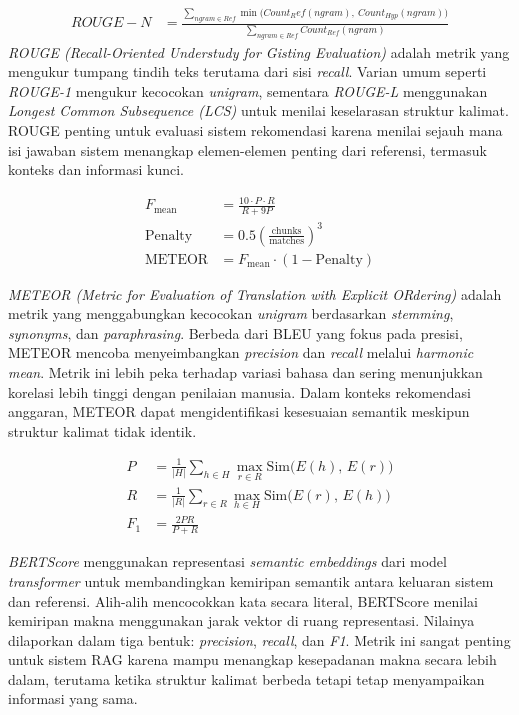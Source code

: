 \begin{align}
ROUGE-N &= \frac{\sum_{ngram \in Ref}\min\big(Count_Ref(ngram),\ Count_{Hyp}(ngram)\big)
}{
\sum_{ngram \in Ref} 
Count_{Ref}(ngram)
}
\end{align}
\textit{ROUGE (Recall-Oriented Understudy for Gisting Evaluation)} adalah metrik yang mengukur tumpang tindih teks terutama dari sisi \textit{recall}. Varian umum seperti \textit{ROUGE-1} mengukur kecocokan \textit{unigram}, sementara \textit{ROUGE-L} menggunakan \textit{Longest Common Subsequence (LCS)} untuk menilai keselarasan struktur kalimat. ROUGE penting untuk evaluasi sistem rekomendasi karena menilai sejauh mana isi jawaban sistem menangkap elemen-elemen penting dari referensi, termasuk konteks dan informasi kunci.

\begin{align}
F_{\text{mean}} &= 
\frac{10 \cdot P \cdot R}{R + 9P}
\\[6pt]
\text{Penalty} &= 
0.5\left( \frac{\text{chunks}}{\text{matches}} \right)^3
\\[6pt]
\text{METEOR} &= 
F_{\text{mean}} \cdot (1 - \text{Penalty})
\end{align}

\textit{METEOR (Metric for Evaluation of Translation with Explicit ORdering)} adalah metrik yang menggabungkan kecocokan \textit{unigram} berdasarkan \textit{stemming}, \textit{synonyms}, dan \textit{paraphrasing}. Berbeda dari BLEU yang fokus pada presisi, METEOR mencoba menyeimbangkan \textit{precision} dan \textit{recall} melalui \textit{harmonic mean}. Metrik ini lebih peka terhadap variasi bahasa dan sering menunjukkan korelasi lebih tinggi dengan penilaian manusia. Dalam konteks rekomendasi anggaran, METEOR dapat mengidentifikasi kesesuaian semantik meskipun struktur kalimat tidak identik.
    
\begin{align}
P &= 
\frac{1}{|H|}
\sum_{h \in H}
\max_{r \in R}
\text{Sim}\big(E(h),\, E(r)\big)
\\[6pt]
R &= 
\frac{1}{|R|}
\sum_{r \in R}
\max_{h \in H}
\text{Sim}\big(E(r),\, E(h)\big)
\\[6pt]
F_{1} &= 
\frac{2PR}{P + R}
\end{align}

\textit{BERTScore} menggunakan representasi \textit{semantic embeddings} dari model \textit{transformer} untuk membandingkan kemiripan semantik antara keluaran sistem dan referensi. Alih-alih mencocokkan kata secara literal, BERTScore menilai kemiripan makna menggunakan jarak vektor di ruang representasi. Nilainya dilaporkan dalam tiga bentuk: \textit{precision}, \textit{recall}, dan \textit{F1}. Metrik ini sangat penting untuk sistem RAG karena mampu menangkap kesepadanan makna secara lebih dalam, terutama ketika struktur kalimat berbeda tetapi tetap menyampaikan informasi yang sama.

